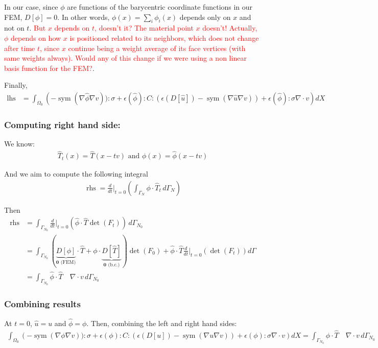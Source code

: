 \documentclass[11pt]{article}
\DeclareMathOperator{\sym}{sym}
\DeclareMathOperator{\lhs}{lhs}
\DeclareMathOperator{\rhs}{rhs}
\begin{document}
In our case, since $\phi$ are functions of the barycentric coordinate functions in our FEM, $D[\phi] = 0$. In other words, $\phi(x) = \sum_i \phi_i(x)$ depends only on $x$ and not on $t$. \textcolor{red}{But $x$ depends on $t$, doesn't it? The material point $x$ doesn't! Actually, $\phi$ depends on how $x$ is positioned related to its neighbors, which does not change after time $t$, since $x$ continue being a weight average of its face vertices (with same weights always). Would any of this change if we were using a non linear basis function for the FEM?}.

Finally,
\begin{align*}
  \lhs &= \int_{\Omega_0} \left(- \sym(\nabla \hat \phi \nabla v)):\sigma + \epsilon(\hat \phi):C:(\epsilon(D[\hat u])  - \sym(\nabla \hat u \nabla v)) + \epsilon(\hat \phi): \sigma \nabla \cdot v \right) dX
\end{align*}

\subsubsection{Computing right hand side:}
We know:
\begin{align*}
  \hat T_t(x) = \hat T(x - tv) \text{ and } \phi(x) = \hat \phi(x - tv)  
\end{align*}

And we aim to compute the following integral
\begin{align*}
  \rhs = \frac{d}{dt} \Big|_{t=0} \left( \int_{\Gamma_N} \phi \cdot \hat T_t\, d\Gamma_N\right)
\end{align*} 

Then
\begin{align*}
  \rhs &= \int_{\Gamma_{N_0}} \frac{d}{dt} \Big|_{t=0} \left(\hat \phi \cdot \hat T \det(F_t) \right)\, d\Gamma_{N_0}\\
  &= \int_{\Gamma_{N_0}} ( \underbrace{D[\phi]}_{\textbf{0} \text{ (FEM)}} \cdot \hat T + \phi \cdot \underbrace{D[\hat T]}_{\textbf{0} \text{ (b.c.)}} ) \det(F_0) + \hat \phi \cdot \hat T \frac{d}{dt} \Big|_{t=0}\left(\det(F_t)\right) d\Gamma \\
  &= \int_{\Gamma_{N_0}} \hat \phi \cdot \hat T \quad \nabla \cdot v\, d\Gamma_{N_0}
\end{align*}

\subsubsection{Combining results}
At $t=0$, $\hat u = u$ and $\hat \phi = \phi$. Then, combining the left and right hand sides:
\begin{align*}
  \int_{\Omega_0} \left(- \sym(\nabla \phi \nabla v)):\sigma + \epsilon(\phi):C:(\epsilon(D[u])  - \sym(\nabla u \nabla v)) + \epsilon(\phi): \sigma \nabla \cdot v \right) dX = \int_{\Gamma_{N_0}} \phi \cdot \hat T \quad \nabla \cdot v\, d\Gamma_{N_0}
\end{align*}
\end{document}

